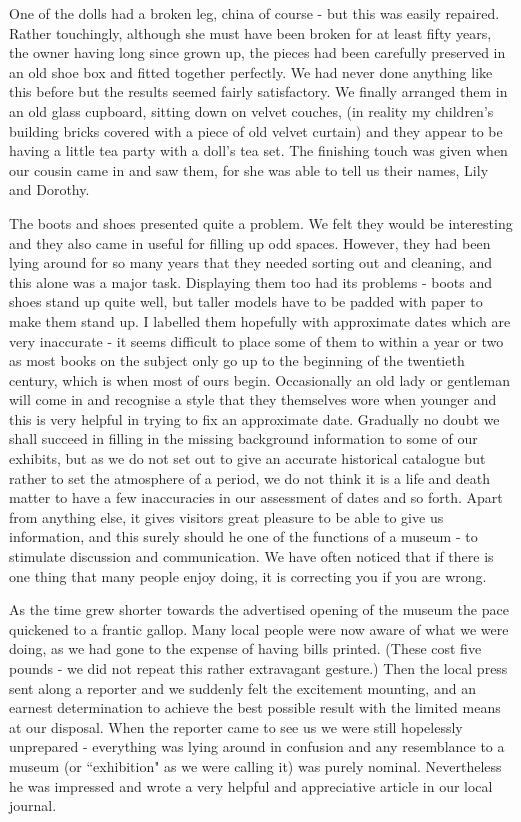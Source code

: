 One of the dolls had a broken leg, china of course - but this was easily repaired. Rather touchingly, although she must have been broken for at least fifty years, the owner having long since grown up, the pieces had been carefully preserved in an old shoe box and fitted together perfectly. We had never done anything like this before but the results seemed fairly satisfactory. We finally arranged them in an old glass cupboard, sitting down on velvet couches, (in reality my children's building bricks covered with a piece of old velvet curtain) and they appear to be having a little tea party with a doll's tea set. The finishing touch was given when our cousin came in and saw them, for she was able to tell us their names, Lily and Dorothy. 

The boots and shoes presented quite a problem. We felt they would be interesting and they also came in useful for filling up odd spaces. However, they had been lying around for so many years that they needed sorting out and cleaning, and this alone was a major task. Displaying them too had its problems - boots and shoes stand up quite well, but taller models have to be padded with paper to make them stand up. I labelled them hopefully with approximate dates which are very inaccurate - it seems difficult to place some of them to within a year or two as most books on the subject only go up to the beginning of the twentieth century, which is when most of ours begin. Occasionally an old lady or gentleman will come in and recognise a style that they themselves wore when younger and this is very helpful in trying to fix an approximate date. Gradually no doubt we shall succeed in filling in the missing background information to some of our exhibits, but as we do not set out to give an accurate historical catalogue but rather to set the atmosphere of a period, we do not think it is a life and death matter to have a few inaccuracies in our assessment of dates and so forth. Apart from anything else, it gives visitors great pleasure to be able to give us information, and this surely should he one of the functions of a museum - to stimulate discussion and communication. We have often noticed that if there is one thing that many people enjoy doing, it is correcting you if you are wrong.

As the time grew shorter towards the advertised opening of the museum the pace quickened to a frantic gallop. Many local people were now aware of what we were doing, as we had gone to the expense of having bills printed. (These cost five pounds - we did not repeat this rather extravagant gesture.) Then the local press sent along a reporter and we suddenly felt the excitement mounting, and an earnest determination to achieve the best possible result with the limited means at our disposal. When the reporter came to see us we were still hopelessly unprepared - everything was lying around in confusion and any resemblance to a museum (or “exhibition" as we were calling it) was purely nominal. Nevertheless he was impressed and wrote a very helpful and appreciative article in our local journal.

